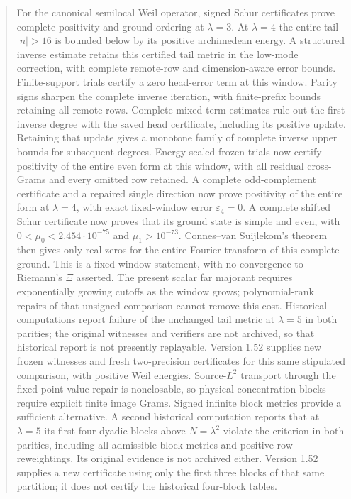 \documentclass[11pt]{article}
\theoremstyle{remark}
\begin{document}
\begin{abstract}
For the canonical semilocal Weil operator, signed Schur certificates
prove complete positivity and ground ordering at $\lambda=3$.
At $\lambda=4$ the entire tail $|n|>16$ is bounded below by its
positive archimedean energy. A structured inverse estimate retains
this certified tail metric in the low-mode correction, with complete
remote-row and dimension-aware error bounds. Finite-support trials
certify a zero head-error term at this window. Parity signs sharpen the complete inverse
iteration, with finite-prefix bounds retaining all remote rows.
Complete mixed-term estimates rule out the first inverse degree
with the saved head certificate, including its positive update.
Retaining that update gives a monotone family of complete inverse
upper bounds for subsequent degrees. Energy-scaled frozen trials now certify positivity of the entire even
form at this window, with all residual cross-Grams and every omitted
row retained. A complete odd-complement certificate and a repaired
single direction now prove positivity of the entire form at
$\lambda=4$, with exact fixed-window error $\varepsilon_4=0$. A complete shifted
Schur certificate now proves that its ground state is simple and even,
with $0<\mu_0<2.454\cdot10^{-75}$ and $\mu_1>10^{-73}$.
Connes--van Suijlekom's theorem then gives only real zeros for the
entire Fourier transform of this complete ground. This is a fixed-window
statement, with no convergence to Riemann's $\Xi$ asserted. The present scalar far
majorant requires exponentially growing cutoffs as the window grows;
polynomial-rank repairs of that unsigned comparison cannot remove
this cost. Historical computations report failure of the unchanged
tail metric at $\lambda=5$ in both parities; the original witnesses
and verifiers are not archived, so that historical report is not presently
replayable. Version 1.52 supplies new frozen witnesses and fresh two-precision
certificates for this same stipulated comparison, with positive Weil energies. Source-$L^2$ transport through the fixed point-value repair
is nonclosable, so physical concentration blocks require explicit
finite image Grams. Signed infinite block metrics provide a sufficient
alternative. A second historical computation reports that at $\lambda=5$
its first four dyadic blocks above $N=\lambda^2$ violate the criterion
in both parities, including all admissible block metrics and positive
row reweightings. Its original evidence is not archived either. Version 1.52 supplies a new
certificate using only the first three blocks of that same partition;
it does not certify the historical four-block tables.

\end{abstract}
\end{document}
